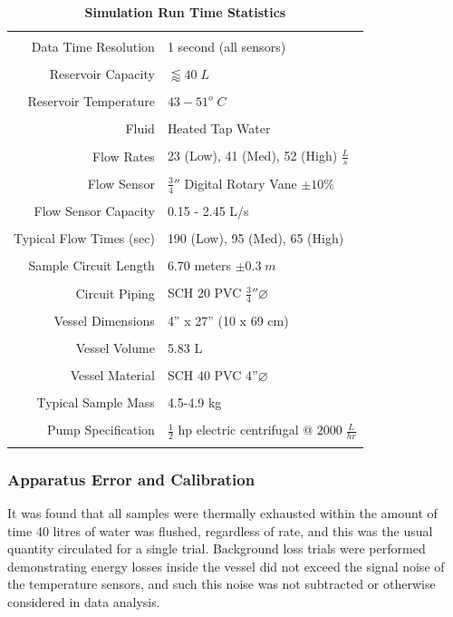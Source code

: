\documentclass[12pt]{article}
\numberwithin{equation}{section}
\numberwithin{table}{section}
\numberwithin{figure}{section}
\begin{document}
\begin{table}[ht!]
\caption[Simulation Run-Time Statistics]{\textbf{Simulation Run Time Statistics}\label{runTime}}
\centering
\begin{tabular}{r l}
\hline
\hline
\\[-.5ex]
Data Time Resolution    & 1 second (all sensors)\\
\\
Reservoir Capacity	& $\lessapprox 40\;L$\\
\\
Reservoir Temperature 	& $43-51^{o}\;C$\\
\\
Fluid 			& Heated Tap Water\\
\\
Flow Rates		& 23 (Low), 41 (Med), 52 (High) $\frac{L}{s}$\\
\\
Flow Sensor		& $\frac{3}{4}''$ Digital Rotary Vane $\pm10\%$\\
\\
Flow Sensor Capacity	& 0.15 - 2.45 L/s\\
\\
Typical Flow Times (sec)& 190 (Low), 95 (Med), 65 (High)\\
\\
Sample Circuit Length	& 6.70 meters $\pm0.3\;m$\\
\\
Circuit Piping		& SCH 20 PVC $\frac{3}{4}''\varnothing$\\
\\
Vessel Dimensions	& 4'' x 27'' (10 x 69 cm)\\
\\
Vessel Volume		& 5.83 L\\
\\
Vessel Material		& SCH 40 PVC 4''$\varnothing$\\
\\
Typical Sample Mass	& 4.5-4.9 kg\\
\\
Pump Specification	& $\frac{1}{2}$ hp electric centrifugal @ $2000\;\frac{L}{hr}$\\
\\
\hline
\end{tabular}
\end{table} 

\subsubsection*{Apparatus Error and Calibration}
It was found that all samples were thermally exhausted within the amount of time 40 litres of water was flushed, regardless of rate, and this was the usual quantity circulated for a single trial. Background loss trials were performed demonstrating energy losses inside the vessel did not exceed the signal noise of the temperature sensors, and such this noise was not subtracted or otherwise considered in data analysis.
\end{document}
